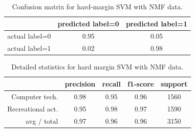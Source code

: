 \documentclass[letterpaper]{article}
\begin{document}
\begin{table}[H]
\centering
\begin{tabular}{c|cc}
 & predicted label=0 & predicted label=1 \\ \hline
actual label=0 & 0.95 & 0.05 \\
actual label=1 & 0.02 & 0.98 \\
\end{tabular}
\caption{Confusion matrix for hard-margin SVM with NMF data.}
\end{table}

\begin{table}[H]
\centering
\begin{tabular}{r|cccc}
 & precision & recall & f1-score & support \\ \hline
Computer tech. & 0.98 & 0.95 & 0.96 & 1560 \\
Recreational act. & 0.95 & 0.98 & 0.97 & 1590 \\
avg / total & 0.97 & 0.96 & 0.96 & 3150 \\
\end{tabular}
\caption{Detailed statistics for hard margin SVM with NMF data.}
\end{table}
\end{document}
